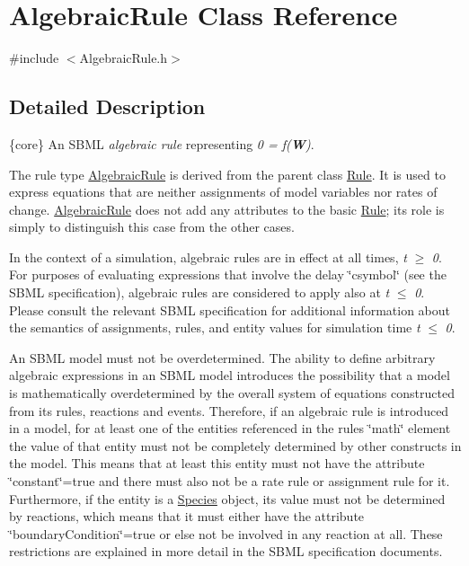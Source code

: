 \hypertarget{class_algebraic_rule}{}\section{Algebraic\+Rule Class Reference}
\label{class_algebraic_rule}


{\ttfamily \#include $<$Algebraic\+Rule.\+h$>$}



\subsection{Detailed Description}
\{core\} An S\+B\+ML {\itshape algebraic rule} representing {\itshape 0 = f({\bfseries W})}.

The rule type \hyperlink{class_algebraic_rule}{Algebraic\+Rule} is derived from the parent class \hyperlink{class_rule}{Rule}. It is used to express equations that are neither assignments of model variables nor rates of change. \hyperlink{class_algebraic_rule}{Algebraic\+Rule} does not add any attributes to the basic \hyperlink{class_rule}{Rule}; its role is simply to distinguish this case from the other cases.

In the context of a simulation, algebraic rules are in effect at all times, {\itshape t} $\geq$ {\itshape 0}. For purposes of evaluating expressions that involve the delay \char`\"{}csymbol\char`\"{} (see the S\+B\+ML specification), algebraic rules are considered to apply also at {\itshape t} $\leq$ {\itshape 0}. Please consult the relevant S\+B\+ML specification for additional information about the semantics of assignments, rules, and entity values for simulation time {\itshape t} $\leq$ {\itshape 0}.

An S\+B\+ML model must not be overdetermined. The ability to define arbitrary algebraic expressions in an S\+B\+ML model introduces the possibility that a model is mathematically overdetermined by the overall system of equations constructed from its rules, reactions and events. Therefore, if an algebraic rule is introduced in a model, for at least one of the entities referenced in the rule\textquotesingle{}s \char`\"{}math\char`\"{} element the value of that entity must not be completely determined by other constructs in the model. This means that at least this entity must not have the attribute \char`\"{}constant\char`\"{}={\ttfamily true} and there must also not be a rate rule or assignment rule for it. Furthermore, if the entity is a \hyperlink{class_species}{Species} object, its value must not be determined by reactions, which means that it must either have the attribute \char`\"{}boundary\+Condition\char`\"{}={\ttfamily true} or else not be involved in any reaction at all. These restrictions are explained in more detail in the S\+B\+ML specification documents.

